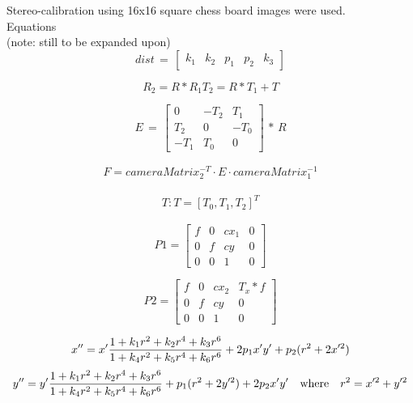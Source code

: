 Stereo-calibration using 16x16 square chess board images were used.\\

Equations\\

(note: still to be expanded upon)\\

\begin{equation}\label{eq:dist}
dist\,=\,\begin{bmatrix}
k_1 & k_2 & p_1 & p_2 & k_3
\end{bmatrix}
\end{equation}

\begin{equation}\label{eq:1} R_2=R*R_1T_2=R*T_1 + T \end{equation}

\begin{equation}\label{eq:2}
E\,=\,\begin{bmatrix}
{0} & {-T_2} & {T_1}\\
{T_2} & {0} & {-T_0}\\
{-T_1} & {T_0} & {0} 
\end{bmatrix}\,*\,R
\end{equation}

\begin{align*}
F = cameraMatrix_2^{-T}\cdot E\cdot cameraMatrix_1^{-1} 
\end{align*}

\begin{align*}
T : T=[T_0, T_1, T_2]^T  
\end{align*}

\begin{equation}\label{eq:P1}
P1 = \begin{bmatrix} f & 0 & cx_1 & 0 \\ 0 & f & cy & 0 \\ 0 & 0 & 1 & 0 \end{bmatrix}
\end{equation}

\begin{equation}\label{eq:P2}
P2 = \begin{bmatrix} f & 0 & cx_2 & T_x*f \\ 0 & f & cy & 0 \\ 0 & 0 & 1 & 0 \end{bmatrix}
\end{equation}

\begin{equation}x'' = x'  \frac{1 + k_1 r^2 + k_2 r^4 + k_3 r^6}{1 + k_4 r^2 + k_5 r^4 + k_6 r^6} + 2 p_1 x' y' + p_2(r^2 + 2 x'^2)  \\ \end{equation}
\begin{equation}y'' = y'  \frac{1 + k_1 r^2 + k_2 r^4 + k_3 r^6}{1 + k_4 r^2 + k_5 r^4 + k_6 r^6} + p_1 (r^2 + 2 y'^2) + 2 p_2 x' y'  \\
\quad \text{where} \quad r^2 = x'^2 + y'^2  \\ \end{equation}


